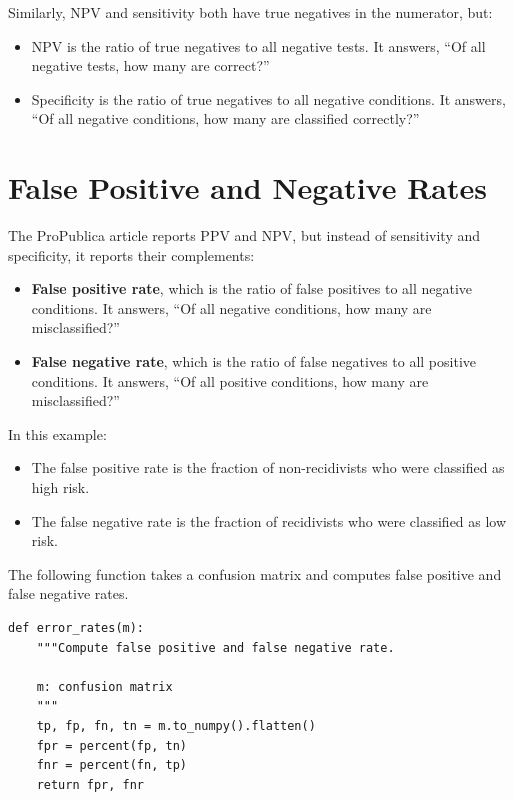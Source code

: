 Similarly, NPV and sensitivity both have true negatives in the
numerator, but:

\begin{itemize}
\item
  NPV is the ratio of true negatives to all negative tests. It answers,
  ``Of all negative tests, how many are correct?''
\item
  Specificity is the ratio of true negatives to all negative conditions.
  It answers, ``Of all negative conditions, how many are classified
  correctly?''
\end{itemize}

\hypertarget{false-positive-and-negative-rates}{%
\section{False Positive and Negative
Rates}\label{false-positive-and-negative-rates}}

The ProPublica article reports PPV and NPV, but instead of sensitivity
and specificity, it reports their complements:

\begin{itemize}
\item
  \textbf{False positive rate}, which is the ratio of false positives to
  all negative conditions. It answers, ``Of all negative conditions, how
  many are misclassified?''
\item
  \textbf{False negative rate}, which is the ratio of false negatives to
  all positive conditions. It answers, ``Of all positive conditions, how
  many are misclassified?''
\end{itemize}

In this example:

\begin{itemize}
\item
  The false positive rate is the fraction of non-recidivists who were
  classified as high risk.
\item
  The false negative rate is the fraction of recidivists who were
  classified as low risk.
\end{itemize}

The following function takes a confusion matrix and computes false
positive and false negative rates.

\begin{lstlisting}[]
def error_rates(m):
    """Compute false positive and false negative rate.
    
    m: confusion matrix
    """
    tp, fp, fn, tn = m.to_numpy().flatten()
    fpr = percent(fp, tn)
    fnr = percent(fn, tp)
    return fpr, fnr
\end{lstlisting}

